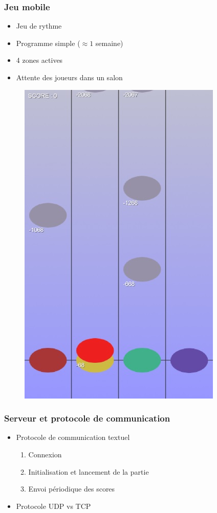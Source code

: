 \begin{frame}
\frametitle{Jeu mobile}
\begin{multicols}{2} 
\begin{itemize}
\item Jeu de rythme
\item Programme simple ($\approx 1$ semaine)
\item 4 zones actives
\item Attente des joueurs dans un salon
\end{itemize} 
\columnbreak 
\begin{figure}
\includegraphics[scale=0.4]{images/jeu3.jpg}
\end{figure}
\end{multicols}
\end{frame}

\begin{frame}
\frametitle{Serveur et protocole de communication}
\begin{center}
\begin{itemize}
\item Protocole de communication textuel
\begin{enumerate}
\item Connexion 
\item Initialisation et lancement de la partie
\item Envoi périodique des scores
\end{enumerate}
\item Protocole UDP vs TCP
\end{itemize}
\end{center}
\end{frame}

